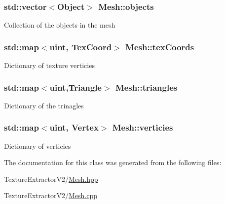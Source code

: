 \subsubsection[{objects}]{\setlength{\rightskip}{0pt plus 5cm}std\+::vector$<${\bf Object}$>$ Mesh\+::objects}\label{class_mesh_ad221985419bdc4e3f30396073e7aa107}
Collection of the objects in the mesh \hypertarget{class_mesh_a615f86622e292b9bfa581cfad823b375}{}
\subsubsection[{tex\+Coords}]{\setlength{\rightskip}{0pt plus 5cm}std\+::map$<$uint, {\bf Tex\+Coord}$>$ Mesh\+::tex\+Coords}\label{class_mesh_a615f86622e292b9bfa581cfad823b375}
Dictionary of texture verticies \hypertarget{class_mesh_a6afb31bd01dac6b21a548341d389b421}{}
\subsubsection[{triangles}]{\setlength{\rightskip}{0pt plus 5cm}std\+::map$<$uint,{\bf Triangle}$>$ Mesh\+::triangles}\label{class_mesh_a6afb31bd01dac6b21a548341d389b421}
Dictionary of the trinagles \hypertarget{class_mesh_a2cef656e11f17c6974a418c4fa0755fe}{}
\subsubsection[{verticies}]{\setlength{\rightskip}{0pt plus 5cm}std\+::map$<$uint, {\bf Vertex}$>$ Mesh\+::verticies}\label{class_mesh_a2cef656e11f17c6974a418c4fa0755fe}
Dictionary of verticies 

The documentation for this class was generated from the following files\+:\begin{DoxyCompactItemize}
\item 
Texture\+Extractor\+V2/\hyperlink{_mesh_8hpp}{Mesh.\+hpp}\item 
Texture\+Extractor\+V2/\hyperlink{_mesh_8cpp}{Mesh.\+cpp}\end{DoxyCompactItemize}
